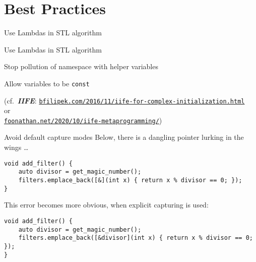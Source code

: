 \begin{frame}
    \centering
    \scalebox{3}{Best Practices}

\end{frame}

\section{Best Practices}

\begin{frame}[fragile]{Use Lambdas in STL algorithm}
\end{frame}

\begin{frame}[fragile]{Use Lambdas in STL algorithm}
\end{frame}

\begin{frame}[fragile]{Stop pollution of namespace with helper variables}
\end{frame}

\begin{frame}[fragile]{Allow variables to be \texttt{const}}

    \begin{center}
        \footnotesize
        (cf.\ \textbf{\textit{IIFE}}: \href{https://www.bfilipek.com/2016/11/iife-for-complex-initialization.html}{\texttt{bfilipek.com/2016/11/iife-for-complex-initialization.html}} \\ or \\ \href{https://foonathan.net/2020/10/iife-metaprogramming/}{\texttt{foonathan.net/2020/10/iife-metaprogramming/}})
    \end{center}
\end{frame}

\begin{frame}[fragile]{Avoid default capture modes}
    Below, there is a dangling pointer lurking in the wings \ldots
    \begin{lstlisting}
void add_filter() {
    auto divisor = get_magic_number();
    filters.emplace_back([&](int x) { return x % divisor == 0; });
}
    \end{lstlisting}

    This error becomes more obvious, when explicit capturing is used:
    \begin{lstlisting}
void add_filter() {
    auto divisor = get_magic_number();
    filters.emplace_back([&divisor](int x) { return x % divisor == 0; });
}
    \end{lstlisting}
\end{frame}

